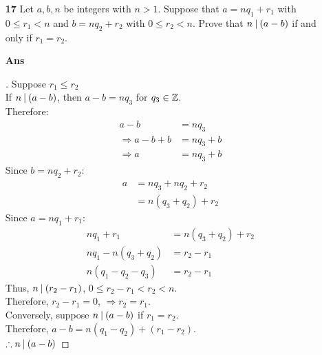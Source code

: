 \documentclass[paper=usletter, fontsize=12pt]{article}
\begin{document}
\begin{itemize}
\begin{itemize}
                \item[\textbf{17}] Let $a, b, n$ be integers with $n > 1$.
                Suppose that $a = nq_1 + r_1$ with $0 \le r_1 < n$ and $b =
                nq_2 + r_2$ with $0 \le r_2 < n$. Prove that $n \:\vert\: (a - b)$
                if and only if $r_1 = r_2$.
                \item[\textbf{Ans}]
                \begin{proof}[\unskip\nopunct]
                    Suppose $r_1 \le r_2$ \\
                    If $n \:\vert\: (a - b)$, then $a - b = nq_3$ for $q_3 \in
                    \mathbb{Z}$. \\
                    Therefore:
                    \begin{align*}
                        a - b & = nq_3 \\
                        \Rightarrow a - b + b & = nq_3 + b \\
                        \Rightarrow a & = nq_3 + b
                    \end{align*}
                    Since $b = nq_2 + r_2$:
                    \begin{align*}
                        a & = nq_3 + nq_2 + r_2 \\
                        & = n(q_3 + q_2) + r_2
                    \end{align*}
                    Since $a = nq_1 + r_1$:
                    \begin{align*}
                        nq_1 + r_1 & = n(q_3 + q_2) + r_2 \\
                        nq_1 - n(q_3 + q_2) & = r_2 - r_1 \\
                        n(q_1 - q_2 - q_3) & = r_2 - r_1
                    \end{align*}
                    Thus, $n \:\vert\: (r_2 - r_1)$, $0 \le r_2 - r_1 < r_2 < n$.
                    \\
                    Therefore, $r_2 - r_1 = 0$, $\Rightarrow r_2 = r_1$. \\
                    Conversely, suppose $n \:\vert\: (a - b)$ if $r_1 = r_2$. \\
                    Therefore, $a - b = n(q_1 - q_2) + (r_1 - r_2)$. \\
                    $\therefore n \:\vert\: (a-b)$ \qedhere
                \end{proof}
                \vspace{0.2in}


\end{itemize}
\end{itemize}
\end{document}
